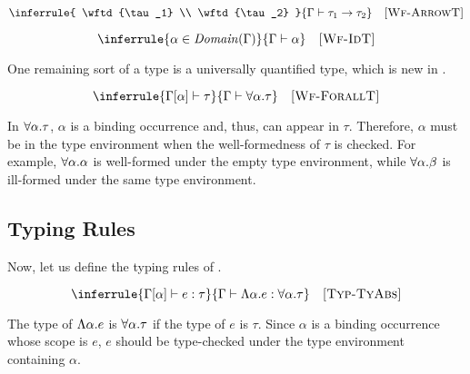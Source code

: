 \vspace{-1em}

\[
  \inferrule
  { \wftd{\tau_1} \\
    \wftd{\tau_2} }
  { \wftd{\tarrow{\tau_1}{\tau_2}} }
  \quad\textsc{[Wf-ArrowT]}
\]


\vspace{-1em}

\[
  \inferrule
  { \alpha\in\dom{\Gamma} }
  { \wftd{\alpha} }
  \quad\textsc{[Wf-IdT]}
\]

One remaining sort of a type is a universally quantified type, which is new in
\lang.


\[
  \inferrule
  { \wft{\Gamma[\alpha]}{\tau} }
  { \wftd{\tforall{\alpha}{\tau}} }
  \quad\textsc{[Wf-ForallT]}
\]

In $\forall\alpha.\tau$, $\alpha$ is a binding occurrence and, thus, can
appear in $\tau$. Therefore, $\alpha$ must be in the type environment when the
well-formedness of $\tau$ is checked. For example, $\forall\alpha.\alpha$
is well-formed under the empty type environment, while $\forall\alpha.\beta$
is ill-formed under the same type environment.

\subsection{Typing Rules}

Now, let us define the typing rules of \lang.


\vspace{-1em}

\[
  \inferrule
  { \typeof{\Gamma[\alpha]}{e}{\tau} }
  { \typeofd{\etfun{\alpha}{e}}{\tforall{\alpha}{\tau}} }
  \quad\textsc{[Typ-TyAbs]}
\]

The type of ${\Lambda\alpha.e}$ is $\forall\alpha.\tau$ if the type of $e$
is $\tau$. Since $\alpha$ is a binding occurrence whose scope is $e$,
$e$ should be type-checked under the type environment containing $\alpha$.

